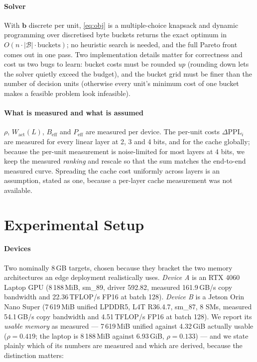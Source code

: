 \documentclass[5p]{elsarticle}
\newcommand{\rhoSym}{\rho}
\begin{document}
\paragraph*{Solver}
With $\mathbf b$ discrete per unit, \eqref{eq:obj} is a multiple-choice knapsack
and dynamic programming over discretised byte buckets returns the exact optimum
in $O(n \cdot |\mathcal{B}| \cdot \text{buckets})$; no heuristic search is
needed, and the full Pareto front comes out in one pass. Two implementation
details matter for correctness and cost us two bugs to learn: bucket costs must
be rounded \emph{up} (rounding down lets the solver quietly exceed the budget),
and the bucket grid must be finer than the number of decision units (otherwise
every unit's minimum cost of one bucket makes a feasible problem look
infeasible).

\paragraph*{What is measured and what is assumed}
$\rhoSym$, $W_{\mathrm{act}}(L)$, $B_{\mathrm{eff}}$ and $P_{\mathrm{eff}}$ are
measured per device. The per-unit costs $\Delta\mathrm{PPL}_i$ are measured for
every linear layer at 2, 3 and 4 bits, and for the cache globally; because the
per-unit measurement is noise-limited for most layers at 4 bits, we keep the
measured \emph{ranking} and rescale so that the sum matches the end-to-end
measured curve. Spreading the cache cost uniformly across layers is an
assumption, stated as one, because a per-layer cache measurement was not
available.

\section{Experimental Setup}
\label{sec:setup}

\paragraph*{Devices}
Two nominally 8\,GB targets, chosen because they bracket the two memory
architectures an edge deployment realistically uses.
\emph{Device A} is an RTX 4060 Laptop GPU (8\,188\,MiB, sm\_89, driver 592.82,
measured 161.9\,GB/s copy bandwidth and 22.36\,TFLOP/s FP16 at batch 128).
\emph{Device B} is a Jetson Orin Nano Super (7\,619\,MiB unified LPDDR5,
L4T R36.4.7, sm\_87, 8 SMs, measured 54.1\,GB/s copy bandwidth and
4.51\,TFLOP/s FP16 at batch 128). We report its \emph{usable memory} as measured --- 7\,619\,MiB unified against
4.32\,GiB actually usable ($\rhoSym{=}0.419$; the laptop is 8\,188\,MiB against
6.93\,GiB, $\rhoSym{=}0.133$) --- and we state plainly which of its numbers are measured and
which are derived, because the distinction matters:
\end{document}
